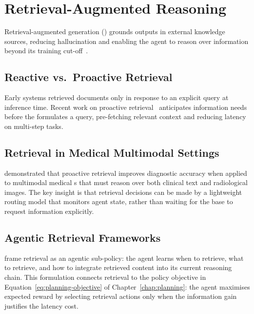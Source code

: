 \chapter{Retrieval-Augmented Reasoning}
\label{chap:retrieval}

Retrieval-augmented generation (\RAG) grounds \LLM{} outputs in external
knowledge sources, reducing hallucination and enabling the agent to reason
over information beyond its training cut-off~\cite{wu2025agenticreasoningtools}.

\section{Reactive vs.\ Proactive Retrieval}
\label{sec:retrieval-proactive}

Early \RAG systems retrieved documents only in response to an explicit
query at inference time.
Recent work on proactive retrieval~\cite{wang2025proactiveretrievalmedical}
anticipates information needs before the \LLM{} formulates a query,
pre-fetching relevant context and reducing latency on multi-step tasks.

\section{Retrieval in Medical Multimodal Settings}
\label{sec:retrieval-medical}

\cite{wang2025proactiveretrievalmedical} demonstrated that proactive
retrieval improves diagnostic accuracy when applied to multimodal medical
\LLM{}s that must reason over both clinical text and radiological images.
The key insight is that retrieval decisions can be made by a lightweight
routing model that monitors agent state, rather than waiting for the base
\LLM{} to request information explicitly.

\section{Agentic Retrieval Frameworks}
\label{sec:retrieval-agentic}

\cite{wu2025agenticreasoningtools} frame retrieval as an agentic sub-policy:
the agent learns when to retrieve, what to retrieve, and how to integrate
retrieved content into its current reasoning chain.
This formulation connects retrieval to the policy objective in
Equation~\eqref{eq:planning-objective} of Chapter~\ref{chap:planning}: the
agent maximises expected reward by selecting retrieval actions only when the
information gain justifies the latency cost.
